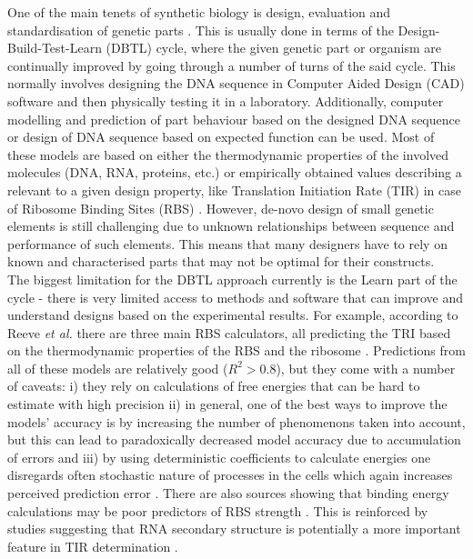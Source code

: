 \documentclass{article}
\begin{document}
One of the main tenets of synthetic biology is design, evaluation and standardisation of genetic parts \cite{Brophy2014,Canton2008,Stanton2014}.
This is usually done in terms of the Design-Build-Test-Learn (DBTL) cycle, where the given genetic part or organism are continually improved by going through a number of turns of the said cycle.
This normally involves designing the DNA sequence in Computer Aided Design (CAD) software and then physically testing it in a laboratory. 
Additionally, computer modelling and prediction of part behaviour based on the designed DNA sequence or design of DNA sequence based on expected function can be used\cite{Yeoh2019,Nielsen2016}.
Most of these models are based on either the thermodynamic properties of the involved molecules (DNA, RNA, proteins, etc.) or empirically obtained values describing a relevant to a given design property, like Translation Initiation Rate (TIR) in case of Ribosome Binding Sites (RBS) \cite{Xia1998,Chen2013,Reeve2014}.
However, de-novo design of small genetic elements is still challenging due to unknown relationships between sequence and performance of such elements. 
This means that many designers have to rely on known and characterised parts that may not be optimal for their constructs.\\
The biggest limitation for the DBTL approach currently is the Learn part of the cycle - there is very limited access to methods and software that can improve and understand designs based on the experimental results.
For example, according to Reeve \emph{et al.} there are three main RBS calculators, all predicting the TRI based on the thermodynamic properties of the RBS and the ribosome \cite{Seo2013,Na2010,Salis2009}. 
Predictions from all of these models are relatively good ($R^2 >0.8$), but they come with a number of caveats: i) they rely on calculations of free energies that can be hard to estimate with high precision ii) in general, one of the best ways to improve the models' accuracy is by increasing the number of phenomenons taken into account, but this can lead to paradoxically decreased model accuracy due to accumulation of errors \cite{EspahBorujeni2016} and iii) by using deterministic coefficients to calculate energies one disregards often stochastic nature of processes in the cells which again increases perceived prediction error \cite{Goss1998}. 
There are also sources showing that binding energy calculations may be poor predictors of RBS strength \cite{Saito2020,Sherer1980} . This is reinforced by studies suggesting that RNA secondary structure is potentially a more important feature in TIR determination \cite{DESMIT1994,EspahBorujeni2016} .\\
\end{document}
